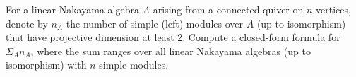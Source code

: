 For a linear Nakayama algebra $A$ arising from a connected quiver on $n$ vertices, denote by $n_A$ the number of simple (left) modules over $A$ (up to isomorphism) that have projective dimension at least 2. Compute a closed-form formula for $\Sigma_A n_A$, where the sum ranges over all linear Nakayama algebras (up to isomorphism) with $n$ simple modules.
